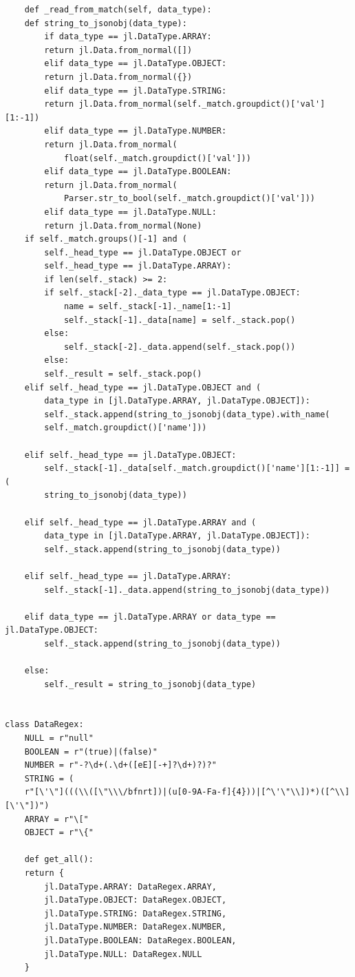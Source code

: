 \documentclass[11pt]{article}
\begin{document}
\begin{lstlisting}
    def _read_from_match(self, data_type):
	def string_to_jsonobj(data_type):
	    if data_type == jl.DataType.ARRAY:
		return jl.Data.from_normal([])
	    elif data_type == jl.DataType.OBJECT:
		return jl.Data.from_normal({})
	    elif data_type == jl.DataType.STRING:
		return jl.Data.from_normal(self._match.groupdict()['val'][1:-1])
	    elif data_type == jl.DataType.NUMBER:
		return jl.Data.from_normal(
		    float(self._match.groupdict()['val']))
	    elif data_type == jl.DataType.BOOLEAN:
		return jl.Data.from_normal(
		    Parser.str_to_bool(self._match.groupdict()['val']))
	    elif data_type == jl.DataType.NULL:
		return jl.Data.from_normal(None)
	if self._match.groups()[-1] and (
		self._head_type == jl.DataType.OBJECT or
		self._head_type == jl.DataType.ARRAY):
	    if len(self._stack) >= 2:
		if self._stack[-2]._data_type == jl.DataType.OBJECT:
		    name = self._stack[-1]._name[1:-1]
		    self._stack[-1]._data[name] = self._stack.pop()
		else:
		    self._stack[-2]._data.append(self._stack.pop())
	    else:
		self._result = self._stack.pop()
	elif self._head_type == jl.DataType.OBJECT and (
		data_type in [jl.DataType.ARRAY, jl.DataType.OBJECT]):
	    self._stack.append(string_to_jsonobj(data_type).with_name(
		self._match.groupdict()['name']))

	elif self._head_type == jl.DataType.OBJECT:
	    self._stack[-1]._data[self._match.groupdict()['name'][1:-1]] = (
		string_to_jsonobj(data_type))

	elif self._head_type == jl.DataType.ARRAY and (
		data_type in [jl.DataType.ARRAY, jl.DataType.OBJECT]):
	    self._stack.append(string_to_jsonobj(data_type))

	elif self._head_type == jl.DataType.ARRAY:
	    self._stack[-1]._data.append(string_to_jsonobj(data_type))

	elif data_type == jl.DataType.ARRAY or data_type == jl.DataType.OBJECT:
	    self._stack.append(string_to_jsonobj(data_type))

	else:
	    self._result = string_to_jsonobj(data_type)


class DataRegex:
    NULL = r"null"
    BOOLEAN = r"(true)|(false)"
    NUMBER = r"-?\d+(.\d+([eE][-+]?\d+)?)?"
    STRING = (
	r"[\'\"](((\\([\"\\\/bfnrt])|(u[0-9A-Fa-f]{4}))|[^\'\"\\])*)([^\\][\'\"])")
    ARRAY = r"\["
    OBJECT = r"\{"

    def get_all():
	return {
	    jl.DataType.ARRAY: DataRegex.ARRAY,
	    jl.DataType.OBJECT: DataRegex.OBJECT,
	    jl.DataType.STRING: DataRegex.STRING,
	    jl.DataType.NUMBER: DataRegex.NUMBER,
	    jl.DataType.BOOLEAN: DataRegex.BOOLEAN,
	    jl.DataType.NULL: DataRegex.NULL
	}
\end{lstlisting}
\end{document}
